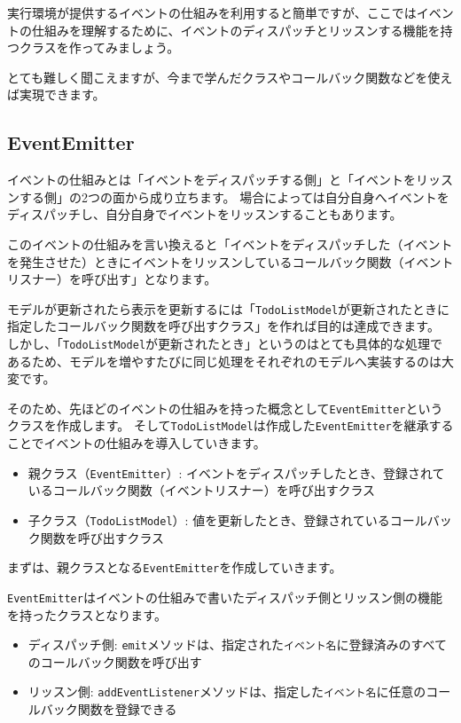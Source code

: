 実行環境が提供するイベントの仕組みを利用すると簡単ですが、ここではイベントの仕組みを理解するために、イベントのディスパッチとリッスンする機能を持つクラスを作ってみましょう。

とても難しく聞こえますが、今まで学んだクラスやコールバック関数などを使えば実現できます。

\hypertarget{event-emitter}{%
\subsection{EventEmitter}\label{event-emitter}}

イベントの仕組みとは「イベントをディスパッチする側」と「イベントをリッスンする側」の2つの面から成り立ちます。
場合によっては自分自身へイベントをディスパッチし、自分自身でイベントをリッスンすることもあります。

このイベントの仕組みを言い換えると「イベントをディスパッチした（イベントを発生させた）ときにイベントをリッスンしているコールバック関数（イベントリスナー）を呼び出す」となります。

モデルが更新されたら表示を更新するには「\texttt{TodoListModel}が更新されたときに指定したコールバック関数を呼び出すクラス」を作れば目的は達成できます。
しかし、「\texttt{TodoListModel}が更新されたとき」というのはとても具体的な処理であるため、モデルを増やすたびに同じ処理をそれぞれのモデルへ実装するのは大変です。

そのため、先ほどのイベントの仕組みを持った概念として\texttt{EventEmitter}というクラスを作成します。
そして\texttt{TodoListModel}は作成した\texttt{EventEmitter}を継承することでイベントの仕組みを導入していきます。

\begin{itemize}
\item
  親クラス（\texttt{EventEmitter}）:
  イベントをディスパッチしたとき、登録されているコールバック関数（イベントリスナー）を呼び出すクラス
\item
  子クラス（\texttt{TodoListModel}）:
  値を更新したとき、登録されているコールバック関数を呼び出すクラス
\end{itemize}

まずは、親クラスとなる\texttt{EventEmitter}を作成していきます。

\texttt{EventEmitter}はイベントの仕組みで書いたディスパッチ側とリッスン側の機能を持ったクラスとなります。

\begin{itemize}
\item
  ディスパッチ側:
  \texttt{emit}メソッドは、指定された\texttt{イベント名}に登録済みのすべてのコールバック関数を呼び出す
\item
  リッスン側:
  \texttt{addEventListener}メソッドは、指定した\texttt{イベント名}に任意のコールバック関数を登録できる
\end{itemize}

